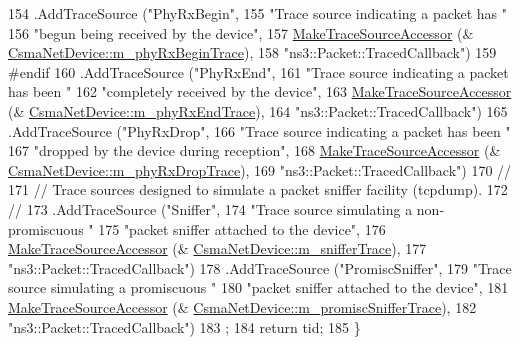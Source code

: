 \begin{DoxyCode}
154     .AddTraceSource (\textcolor{stringliteral}{"PhyRxBegin"}, 
155                      \textcolor{stringliteral}{"Trace source indicating a packet has "}
156                      \textcolor{stringliteral}{"begun being received by the device"},
157                      \hyperlink{group__tracing_gab21a770b9855af4e8f69f7531ea4a6b0}{MakeTraceSourceAccessor} (&
      \hyperlink{classns3_1_1CsmaNetDevice_abdbb5dd4d62426a5ad0f6cb8cb030b3b}{CsmaNetDevice::m\_phyRxBeginTrace}),
158                      \textcolor{stringliteral}{"ns3::Packet::TracedCallback"})
159 \textcolor{preprocessor}{#endif}
160     .AddTraceSource (\textcolor{stringliteral}{"PhyRxEnd"}, 
161                      \textcolor{stringliteral}{"Trace source indicating a packet has been "}
162                      \textcolor{stringliteral}{"completely received by the device"},
163                      \hyperlink{group__tracing_gab21a770b9855af4e8f69f7531ea4a6b0}{MakeTraceSourceAccessor} (&
      \hyperlink{classns3_1_1CsmaNetDevice_afe2bac4b10c5d73f78e11668a3e6a679}{CsmaNetDevice::m\_phyRxEndTrace}),
164                      \textcolor{stringliteral}{"ns3::Packet::TracedCallback"})
165     .AddTraceSource (\textcolor{stringliteral}{"PhyRxDrop"}, 
166                      \textcolor{stringliteral}{"Trace source indicating a packet has been "}
167                      \textcolor{stringliteral}{"dropped by the device during reception"},
168                      \hyperlink{group__tracing_gab21a770b9855af4e8f69f7531ea4a6b0}{MakeTraceSourceAccessor} (&
      \hyperlink{classns3_1_1CsmaNetDevice_a9413b693a3028dcccb20f653bad58bc0}{CsmaNetDevice::m\_phyRxDropTrace}),
169                      \textcolor{stringliteral}{"ns3::Packet::TracedCallback"})
170     \textcolor{comment}{//}
171     \textcolor{comment}{// Trace sources designed to simulate a packet sniffer facility (tcpdump). }
172     \textcolor{comment}{//}
173     .AddTraceSource (\textcolor{stringliteral}{"Sniffer"}, 
174                      \textcolor{stringliteral}{"Trace source simulating a non-promiscuous "}
175                      \textcolor{stringliteral}{"packet sniffer attached to the device"},
176                      \hyperlink{group__tracing_gab21a770b9855af4e8f69f7531ea4a6b0}{MakeTraceSourceAccessor} (&
      \hyperlink{classns3_1_1CsmaNetDevice_a88e5994b762e01f74606742a7f15b797}{CsmaNetDevice::m\_snifferTrace}),
177                      \textcolor{stringliteral}{"ns3::Packet::TracedCallback"})
178     .AddTraceSource (\textcolor{stringliteral}{"PromiscSniffer"}, 
179                      \textcolor{stringliteral}{"Trace source simulating a promiscuous "}
180                      \textcolor{stringliteral}{"packet sniffer attached to the device"},
181                      \hyperlink{group__tracing_gab21a770b9855af4e8f69f7531ea4a6b0}{MakeTraceSourceAccessor} (&
      \hyperlink{classns3_1_1CsmaNetDevice_aae7fbd28077e7ac8efee738c4194ed16}{CsmaNetDevice::m\_promiscSnifferTrace}),
182                      \textcolor{stringliteral}{"ns3::Packet::TracedCallback"})
183   ;
184   \textcolor{keywordflow}{return} tid;
185 \}
\end{DoxyCode}


